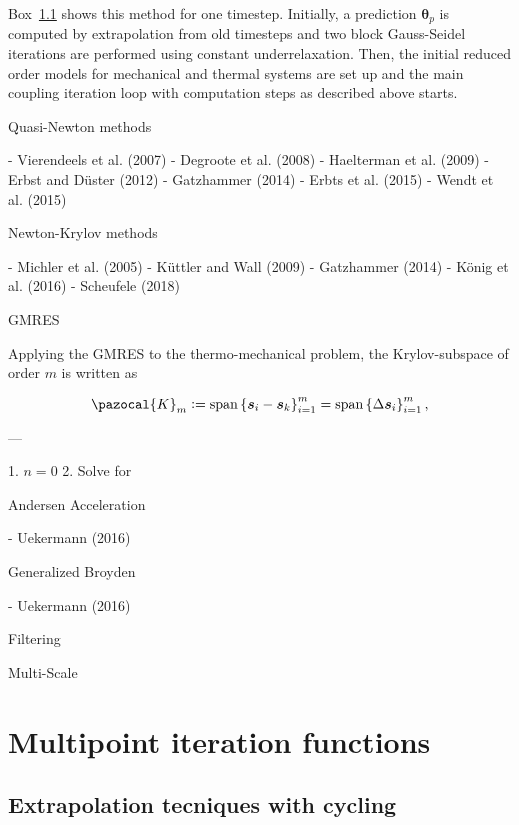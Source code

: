 Box~\ref{} shows this method for one timestep. Initially, a prediction $\boldsymbol \theta_p$ is computed by extrapolation from old timesteps and two block Gauss-Seidel iterations are performed using constant underrelaxation. Then, the initial reduced order models for mechanical and thermal systems are set up and the main coupling iteration loop with computation steps as described above starts.

 Quasi-Newton methods

- Vierendeels et al. (2007)
- Degroote et al. (2008)
- Haelterman et al. (2009)
- Erbst and Düster (2012)
- Gatzhammer (2014)
- Erbts et al. (2015)
- Wendt et al. (2015)

 Newton-Krylov methods

- Michler et al. (2005)
- Küttler and Wall (2009)
- Gatzhammer (2014)
- König et al. (2016)
- Scheufele (2018)

 GMRES

Applying the GMRES to the thermo-mechanical problem, the Krylov-subspace of order $m$ is written as

$$
\pazocal{K}_{m}:=\operatorname{span}\left\{\boldsymbol{s}_{i}-\boldsymbol{s}_{k}\right\}_{i=1}^{m}=\operatorname{span}\left\{\Delta \boldsymbol{s}_{i}\right\}_{i=1}^{m},
$$

---

1. $n = 0$
2. Solve for

 Andersen Acceleration

- Uekermann (2016)

 Generalized Broyden

- Uekermann (2016)

 Filtering

 Multi-Scale


\section{Multipoint iteration functions}

\subsection{Extrapolation tecniques with cycling}

